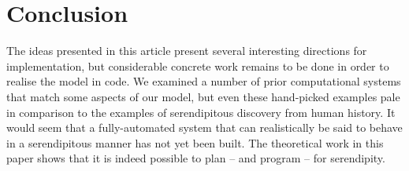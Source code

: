 \section{Conclusion} \label{sec:conclusion}

The ideas presented in this article present several interesting
directions for implementation, but considerable concrete work remains
to be done in order to realise the model in code.  We examined a
number of prior computational systems that match some aspects of our
model, but even these hand-picked examples pale in comparison to the
examples of serendipitous discovery from human history.  It would seem
that a fully-automated system that can realistically be said to behave
in a serendipitous manner has not yet been built.
The theoretical work in this paper shows that it is indeed possible to
plan -- and program -- for serendipity.
